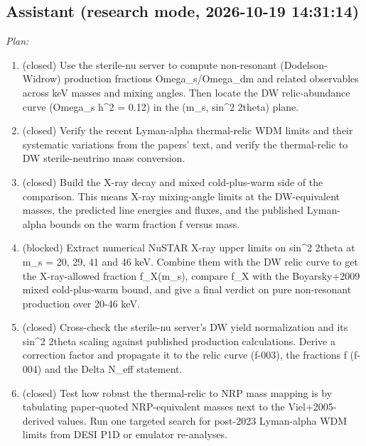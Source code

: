 \documentclass[11pt,a4paper]{article}
\begin{document}
\subsection*{Assistant \small(research mode, 2026-10-19 14:31:14)}
\textit{Plan:}\begin{enumerate}
  \item (closed) Use the sterile-nu server to compute non-resonant (Dodelson-Widrow) production fractions Omega\_s/Omega\_dm and related observables across keV masses and mixing angles. Then locate the DW relic-abundance curve (Omega\_s h\textasciicircum{}2 = 0.12) in the (m\_s, sin\textasciicircum{}2 2theta) plane.
  \item (closed) Verify the recent Lyman-alpha thermal-relic WDM limits and their systematic variations from the papers' text, and verify the thermal-relic to DW sterile-neutrino mass conversion.
  \item (closed) Build the X-ray decay and mixed cold-plus-warm side of the comparison. This means X-ray mixing-angle limits at the DW-equivalent masses, the predicted line energies and fluxes, and the published Lyman-alpha bounds on the warm fraction f versus mass.
  \item (blocked) Extract numerical NuSTAR X-ray upper limits on sin\textasciicircum{}2 2theta at m\_s = 20, 29, 41 and 46 keV. Combine them with the DW relic curve to get the X-ray-allowed fraction f\_X(m\_s), compare f\_X with the Boyarsky+2009 mixed cold-plus-warm bound, and give a final verdict on pure non-resonant production over 20-46 keV.
  \item (closed) Cross-check the sterile-nu server's DW yield normalization and its sin\textasciicircum{}2 2theta scaling against published production calculations. Derive a correction factor and propagate it to the relic curve (f-003), the fractions f (f-004) and the Delta N\_eff statement.
  \item (closed) Test how robust the thermal-relic to NRP mass mapping is by tabulating paper-quoted NRP-equivalent masses next to the Viel+2005-derived values. Run one targeted search for post-2023 Lyman-alpha WDM limits from DESI P1D or emulator re-analyses.
\end{enumerate}
\end{document}

